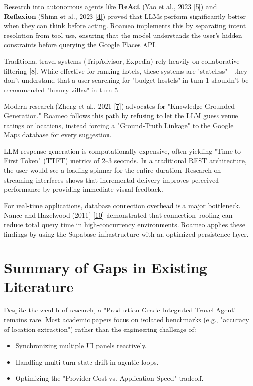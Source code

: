 \documentclass[12pt,a4paper]{report}
\newcommand{\chapcite}[1]{\hyperlink{ref:#1}{[#1]}}
\newcommand{\chapcitetarget}[1]{\hypertarget{cite:#1}{}\chapcite{#1}}
\begin{document}
Research into autonomous agents like \textbf{ReAct} (Yao et al., 2023 \chapcitetarget{5}) and \textbf{Reflexion} (Shinn et al., 2023 \chapcitetarget{4}) proved that LLMs perform significantly better when they can think before acting. Roameo implements this by separating intent resolution from tool use, ensuring that the model understands the user's hidden constraints before querying the Google Places API.

Traditional travel systems (TripAdvisor, Expedia) rely heavily on collaborative filtering \chapcitetarget{8}. While effective for ranking hotels, these systems are "stateless"---they don't understand that a user searching for "budget hostels" in turn 1 shouldn't be recommended "luxury villas" in turn 5.

Modern research (Zheng et al., 2021 \chapcitetarget{7}) advocates for "Knowledge-Grounded Generation." Roameo follows this path by refusing to let the LLM guess venue ratings or locations, instead forcing a "Ground-Truth Linkage" to the Google Maps database for every suggestion.

LLM response generation is computationally expensive, often yielding "Time to First Token" (TTFT) metrics of 2--3 seconds. In a traditional REST architecture, the user would see a loading spinner for the entire duration. Research on streaming interfaces shows that incremental delivery improves perceived performance by providing immediate visual feedback.

For real-time applications, database connection overhead is a major bottleneck. Nance and Hazelwood (2011) \chapcitetarget{10} demonstrated that connection pooling can reduce total query time in high-concurrency environments. Roameo applies these findings by using the Supabase infrastructure with an optimized persistence layer.

\section{Summary of Gaps in Existing Literature}

Despite the wealth of research, a "Production-Grade Integrated Travel Agent" remains rare. Most academic papers focus on isolated benchmarks (e.g., "accuracy of location extraction") rather than the engineering challenge of:
\begin{itemize}[nosep]
    \item Synchronizing multiple UI panels reactively.
    \item Handling multi-turn state drift in agentic loops.
    \item Optimizing the "Provider-Cost vs. Application-Speed" tradeoff.
\end{itemize}
\end{document}
